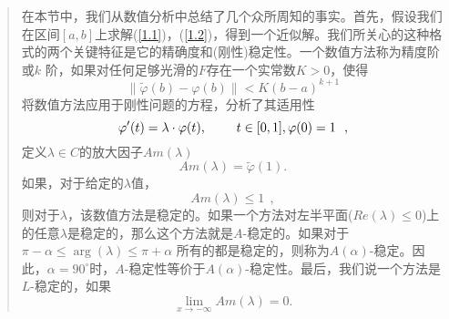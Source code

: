 \documentclass{article}
\begin{document}
\begin{CJK}{UTF8}{gkai}
\begin{quotation}
在本节中，我们从数值分析中总结了几个众所周知的事实。首先，假设我们在区间$[a,b]$上求解(\ref{1.1})，(\ref{1.2})，得到一个近似解。我们所关心的这种格式的两个关键特征是它的精确度和(刚性)稳定性。一个数值方法称为精度阶或$k$ 阶，如果对任何足够光滑的$F$存在一个实常数$K > 0$，使得\\
\begin{equation}
\label{2.1}
\parallel \tilde{\varphi} (b) - \varphi(b) \parallel < K (b-a)^{k+1}
\end{equation}
将数值方法应用于刚性问题的方程，分析了其适用性\\
\begin{equation}
\varphi ' (t)= \lambda \cdot \varphi(t),~~~~~~~t \in [0,1], \\
\varphi (0)=1~~,
\label{2.2}
\end{equation}
定义$\lambda \in C$的放大因子$Am(\lambda)$\\
\begin{equation}
\label{2.3}
Am(\lambda)= \tilde{ \varphi }(1).
\end{equation}
如果，对于给定的$\lambda$值，\\
\begin{equation}
Am(\lambda) \leq 1 ~~,
\end{equation}
则对于$\lambda$，该数值方法是稳定的。如果一个方法对左半平面($Re(\lambda) \leq 0$)上的任意$\lambda$是稳定的，那么这个方法就是$A$-稳定的。如果对于$\pi - \alpha \leq \arg (\lambda) \leq \pi + \alpha$ 所有的都是稳定的，则称为$A(\alpha)$-稳定。因此，$\alpha=90^\circ$时，$A$-稳定性等价于$A(\alpha)$-稳定性。最后，我们说一个方法是$L$-稳定的，如果\\
\begin{equation}
\lim_{x \to -\infty} Am(\lambda)= 0.
\end{equation}

\end{quotation}
\end{CJK}
\end{document}
